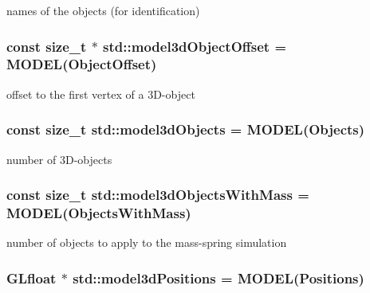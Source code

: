 names of the objects (for identification) 

\hypertarget{namespacestd_a34c26b88877b9e50d420b2f5ee1c1c47}{}
\subsubsection[{model3d\+Object\+Offset}]{\setlength{\rightskip}{0pt plus 5cm}const size\+\_\+t $\ast$ std\+::model3d\+Object\+Offset = {\bf M\+O\+D\+E\+L}(Object\+Offset)}\label{namespacestd_a34c26b88877b9e50d420b2f5ee1c1c47}


offset to the first vertex of a 3\+D-\/object 

\hypertarget{namespacestd_ae8e9077260287353aa87ecaadb67b8e7}{}
\subsubsection[{model3d\+Objects}]{\setlength{\rightskip}{0pt plus 5cm}const size\+\_\+t std\+::model3d\+Objects = {\bf M\+O\+D\+E\+L}(Objects)}\label{namespacestd_ae8e9077260287353aa87ecaadb67b8e7}


number of 3\+D-\/objects 

\hypertarget{namespacestd_a74aad4fa6e8a984849221081da2ef691}{}
\subsubsection[{model3d\+Objects\+With\+Mass}]{\setlength{\rightskip}{0pt plus 5cm}const size\+\_\+t std\+::model3d\+Objects\+With\+Mass = {\bf M\+O\+D\+E\+L}(Objects\+With\+Mass)}\label{namespacestd_a74aad4fa6e8a984849221081da2ef691}


number of objects to apply to the mass-\/spring simulation 

\hypertarget{namespacestd_aa45ed5de4e82f7ca1e4fd453a157715c}{}
\subsubsection[{model3d\+Positions}]{\setlength{\rightskip}{0pt plus 5cm}G\+Lfloat $\ast$ std\+::model3d\+Positions = {\bf M\+O\+D\+E\+L}(Positions)}\label{namespacestd_aa45ed5de4e82f7ca1e4fd453a157715c}


